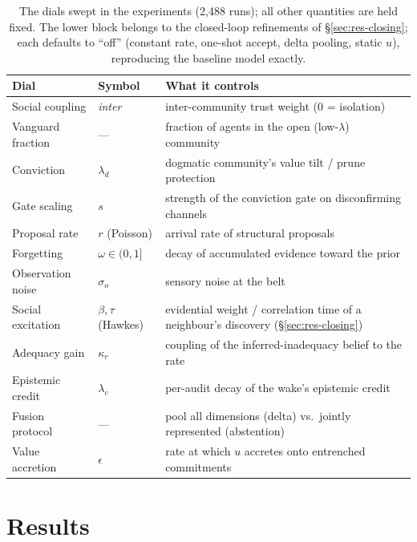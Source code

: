 \documentclass[11pt]{article}
\begin{document}
\begin{table}[h!]
\centering\footnotesize
\begin{tabular}{lll}
\hline
Dial & Symbol & What it controls \\
\hline
Social coupling & \emph{inter} & inter-community trust weight (0 = isolation) \\
Vanguard fraction & --- & fraction of agents in the open (low-$\lambda$) community \\
Conviction & $\lambda_d$ & dogmatic community's value tilt / prune protection \\
Gate scaling & $s$ & strength of the conviction gate on disconfirming channels \\
Proposal rate & $r$ (Poisson) & arrival rate of structural proposals \\
Forgetting & $\omega\in(0,1]$ & decay of accumulated evidence toward the prior \\
Observation noise & $\sigma_o$ & sensory noise at the belt \\
Social excitation & $\beta,\tau$ (Hawkes) & evidential weight / correlation time of a
neighbour's discovery (\S\ref{sec:res-closing}) \\
Adequacy gain & $\kappa_r$ & coupling of the inferred-inadequacy belief to the rate \\
Epistemic credit & $\lambda_c$ & per-audit decay of the wake's epistemic credit \\
Fusion protocol & --- & pool all dimensions (delta) vs.\ jointly represented (abstention) \\
Value accretion & $\epsilon$ & rate at which $u$ accretes onto entrenched commitments \\
\hline
\end{tabular}
\caption{The dials swept in the experiments (2{,}488 runs); all other quantities are held fixed.
The lower block belongs to the closed-loop refinements of \S\ref{sec:res-closing}; each defaults
to ``off'' (constant rate, one-shot accept, delta pooling, static $u$), reproducing the baseline
model exactly.}
\label{tab:dials}
\end{table}

\section{Results}
\label{sec:results}
\end{document}
